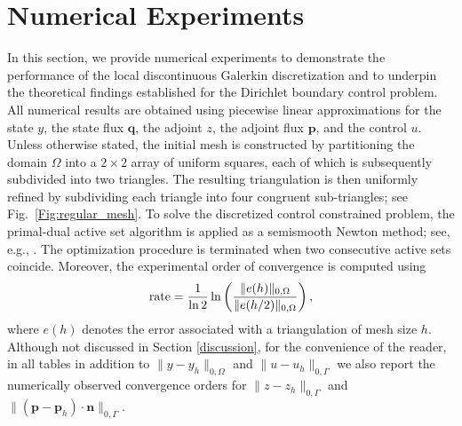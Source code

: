 \documentclass[a4paper,10pt]{article}
\newcommand{\mh}[1]{\todo[inline,color=teal!30]{MH: #1}}
\newcommand{\h}[2][cyan]{\emph{\textcolor{#1}{#2}}}
\newcommand{\bq}{{\mathbf{q}}}
\newcommand{\bp}{{\mathbf{p}}}
\numberwithin{theorem}{section}
\newcommand{\x}[2][blue]{#2}
\begin{document}

\section{Numerical Experiments} \label{sec:numeric}


In this section, we provide numerical experiments to demonstrate the performance of the local discontinuous Galerkin discretization and to underpin the theoretical findings established for the Dirichlet boundary control problem. All numerical results are obtained using piecewise linear approximations for the state $y$, the state flux $\bq$, the adjoint $z$, the adjoint flux $\bp$, and the control $u$. \x{Unless otherwise stated, the initial mesh is constructed by partitioning the domain $\Omega$ into a $2 \times 2$ array of uniform squares, each of which is subsequently subdivided into two triangles. The resulting triangulation is then uniformly refined by subdividing each triangle into four congruent sub-triangles; see Fig.~\ref{Fig:regular_mesh}.} To solve the discretized  control constrained problem, the primal-dual active set algorithm is applied as a semismooth Newton method; see, e.g., \cite{MBergounioux_KIto_KKunisch_1999a}. The optimization procedure is terminated when two consecutive active sets coincide. Moreover, the experimental order of convergence is computed using
\[
\hbox{rate} = \frac{1}{\ln 2} \ln \left( \frac{\|e(h)\|_{0,\Omega}}{\|e(h/2)\|_{0,\Omega}}\right),
\]
where $e(h)$ denotes the error associated with a triangulation of mesh size $h$. \x{Although not discussed in Section \ref{discussion}, for the convenience of the reader, in all tables in addition to $\|y-y_h\|_{0,\Omega}$ and $\|u-u_h\|_{0,\Gamma}$ we also report the numerically observed convergence orders for $\|z-z_h\|_{0,\Gamma}$ and $\|(\bp-\bp_h)\cdot \mathbf n\|_{0,\Gamma}$.}
\end{document}
